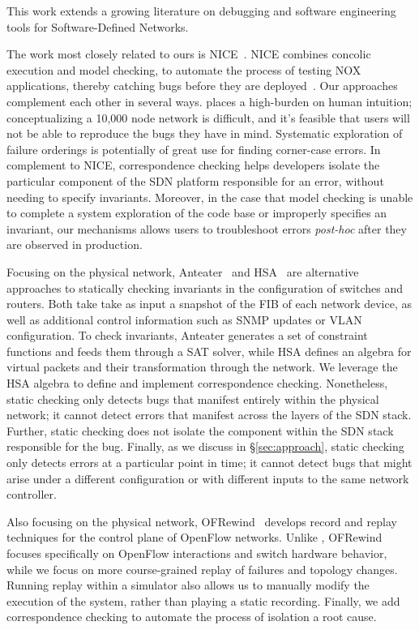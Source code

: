 
This work extends a growing literature on debugging and software engineering tools for
Software-Defined Networks.
    
The work most closely related to ours is NICE~\cite{nice}. NICE combines concolic execution
and model checking, to automate the process of testing NOX applications,
thereby catching bugs before
they are deployed~\cite{nice}. Our approaches complement each other in several ways. 
\Simulator places a high-burden on human intuition; conceptualizing
a 10,000 node network is difficult, and it's feasible that users will not be able 
to reproduce the bugs they have in mind. Systematic exploration of failure orderings 
is potentially of great use for finding corner-case errors.
In complement to NICE, correspondence checking helps developers isolate the particular 
component of the SDN platform responsible for an error, without needing to specify invariants.
Moreover, in the case that
model checking is unable to complete a system exploration of the code base or improperly
 specifies an invariant, our mechanisms allows users to troubleshoot errors 
{\it post-hoc} after they are observed in production.

Focusing on the physical network, Anteater~\cite{anteater} and HSA~\cite{hsa}
are alternative approaches to statically checking invariants in the
configuration of switches and routers. Both take take as input a snapshot of
the FIB of each network device, as well as
additional control information such as SNMP updates or VLAN configuration.
To check invariants, Anteater generates a set of constraint functions and feeds them through a SAT
solver, while HSA defines an algebra for virtual packets and
their transformation through the network. We leverage the HSA algebra to
define and implement correspondence checking. Nonetheless, static checking
only detects bugs that manifest entirely within the physical network;  
it cannot detect errors that manifest across the layers of the SDN stack. Further,
static checking does not isolate the component within the SDN stack
responsible for the bug. Finally, as we discuss in \S\ref{sec:approach},
static checking only detects errors at a particular point in time; it cannot 
detect bugs that might arise under a different configuration or with different
inputs to the same network controller.

Also focusing on the physical network, OFRewind~\cite{ofrewind} develops
record and replay techniques for the control plane of OpenFlow networks.
Unlike \simulator, OFRewind focuses specifically on OpenFlow
interactions and switch hardware behavior, while we focus on more course-grained replay of
failures and topology changes. Running replay within a simulator also allows
us to manually modify the execution of the system, rather than playing a
static recording. Finally, we add correspondence checking to automate the
process of isolation a root cause.


